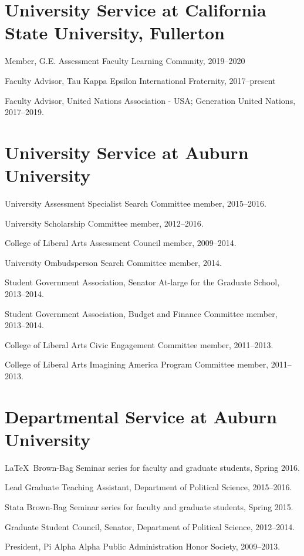 \documentclass[11pt,letterpaper]{article}
\renewenvironment{itemize}{
  \begin{list}{}{
    \setlength{\leftmargin}{1.5em}
    \setlength{\itemsep}{0.25em}
    \setlength{\parskip}{0pt}
    \setlength{\parsep}{0.25em}
  }
}{
  \end{list}
}
\begin{document}
\section*{University Service at California State University, Fullerton}
	\begin{itemize}
		\item Member, G.E. Assessment Faculty Learning Commnity, 2019--2020
		\item Faculty Advisor, Tau Kappa Epsilon International Fraternity, 2017--present
		\item Faculty Advisor, United Nations Association - USA; Generation United Nations, 2017--2019.
	\end{itemize}
	
\section*{University Service at Auburn University}
\begin{itemize}
	\item University Assessment Specialist Search Committee member, 2015--2016.
	\item University Scholarship Committee member, 2012--2016.
	\item College of Liberal Arts Assessment Council member, 2009--2014.
	\item University Ombudsperson Search Committee member, 2014.  
	\item Student Government Association, Senator At-large for the Graduate School, 2013--2014.
	\item Student Government Association, Budget and Finance Committee member, 2013--2014.
	\item College of Liberal Arts Civic Engagement Committee member, 2011--2013.
	\item College of Liberal Arts Imagining America Program Committee member, 2011--2013.
\end{itemize}

\section*{Departmental Service at Auburn University}
	\begin{itemize}
		\item \LaTeX~Brown-Bag Seminar series for faculty and graduate students, Spring 2016.
		\item Lead Graduate Teaching Assistant, Department of Political Science, 2015--2016.
		\item Stata Brown-Bag Seminar series for faculty and graduate students, Spring 2015.
		\item Graduate Student Council, Senator, Department of Political Science, 2012--2014.
		\item President, Pi Alpha Alpha Public Administration Honor Society, 2009--2013.
	\end{itemize}
\end{document}
